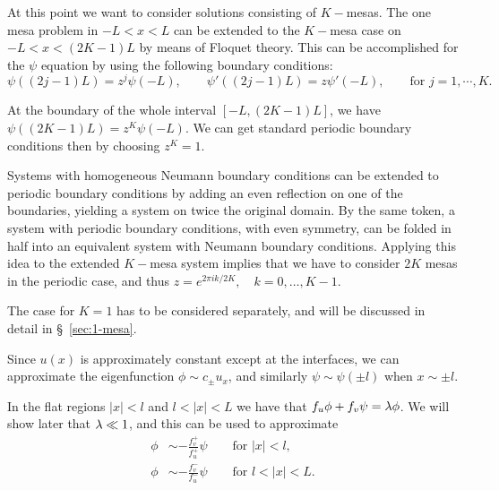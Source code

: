 \begin{remark}
At this point we want to consider solutions consisting of $K-$mesas. The one mesa problem in $-L<x<L$ can be extended to the $K-$mesa case on $-L<x<(2K-1)L$ by means of Floquet theory. This can be accomplished for the $\psi$ equation by using the following boundary conditions:
% 
\begin{equation*}
  \psi((2j-1)L) = z^j\psi(-L),\qquad  \psi'((2j-1)L) = z\psi'(-L),\qquad\text{for }j=1,\cdots,K.
\end{equation*}
% 

At the boundary of the whole interval $[-L,(2K-1)L]$, we have $\psi((2K-1)L) = z^K\psi(-L)$. We can get standard periodic boundary conditions then by choosing $z^K=1$.

Systems with homogeneous Neumann boundary conditions can be extended to periodic boundary conditions by adding an even reflection on one of the boundaries, yielding a system on twice the original domain. By the same token, a system with periodic boundary conditions, with even symmetry, can be folded in half into an equivalent system with Neumann boundary conditions. Applying this idea to the extended $K-$mesa system implies that we have to consider $2K$ mesas in the periodic case, and thus $z = e^{2\pi ik/2K},\quad k = 0,\hdots,K-1$. 

The case for $K=1$ has to be considered separately, and will be discussed in detail in \S~\ref{sec:1-mesa}.
\end{remark}

Since $u(x)$ is approximately constant except at the interfaces, we can approximate the eigenfunction $\phi\sim c_{\pm}u_x$, and similarly $\psi\sim\psi(\pm l)$ when $x\sim\pm l$.

In the flat regions $|x|<l$ and $l<|x|<L$ we have that 	$f_u\phi + f_v\psi = \lambda\phi$. We will show later that $\lambda\ll 1$, and this can be used to approximate
% 
\begin{equation*}
\begin{split}
	\phi&\sim -\frac{f_v^+}{f_u^+}\psi\qquad\text{for }|x|<l,\\
	\phi&\sim -\frac{f_v^-}{f_u^-}\psi\qquad\text{for }l<|x|<L.
\end{split}
\end{equation*}
% 

